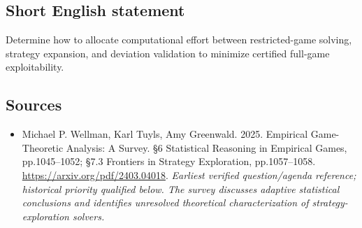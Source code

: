 \documentclass[11pt]{article}
\begin{document}
\subsection{Short English statement}
Determine how to allocate computational effort between restricted-game solving, strategy expansion, and deviation validation to minimize certified full-game exploitability.

\subsection{Sources}
\begin{itemize}\raggedright
\item[\textnormal{[S1]}]\hypertarget{source:30007571:1}{} Michael P. Wellman, Karl Tuyls, Amy Greenwald. 2025. Empirical Game-Theoretic Analysis: A Survey. §6 Statistical Reasoning in Empirical Games, pp.1045–1052; §7.3 Frontiers in Strategy Exploration, pp.1057–1058.
\url{https://arxiv.org/pdf/2403.04018}.
{\small\textit{Earliest verified question/agenda reference; historical priority qualified below. The survey discusses adaptive statistical conclusions and identifies unresolved theoretical characterization of strategy-exploration solvers.}}
\end{itemize}
\end{document}
